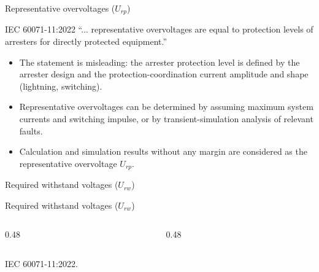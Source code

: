 \begin{frame}{Representative overvoltages ($U_{rp}$)}
  \begin{block}{IEC 60071-11:2022}
    ``... representative overvoltages are equal to protection levels of
    arresters for directly protected equipment.''
  \end{block}
  \begin{itemize}
    \setlength{\itemsep}{0.4em}
    \item The statement is misleading: the arrester protection level is
          defined by the arrester design and the protection-coordination
          current amplitude and shape (lightning, switching).
    \item Representative overvoltages can be determined by assuming maximum
          system currents and switching impulse, or by transient-simulation
          analysis of relevant faults.
    \item Calculation and simulation results without any margin are
          considered as the representative overvoltage $U_{rp}$.
  \end{itemize}
\end{frame}

\begin{frame}{Required withstand voltages ($U_{rw}$)}
  \centering
\end{frame}

\begin{frame}{Required withstand voltages ($U_{rw}$)}
  \begin{columns}[c,onlytextwidth]
    \begin{column}{0.48\textwidth}
      \centering
    \end{column}
    \begin{column}{0.48\textwidth}
      \centering
    \end{column}
  \end{columns}
  \vspace{0.3em}
  {\color{atGray}\footnotesize IEC 60071-11:2022.}
\end{frame}

